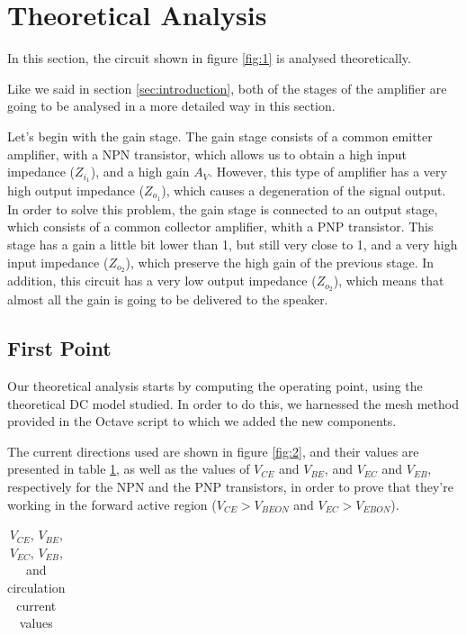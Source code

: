 \section{Theoretical Analysis}
\label{sec:theoretical}

\par In this section, the circuit shown in figure \ref{fig:1} is analysed theoretically.
\par Like we said in section \ref{sec:introduction}, both of the stages of the amplifier are going to be analysed in a more detailed way in this section.
\par Let's begin with the gain stage. The gain stage consists of a common emitter amplifier, with a NPN transistor, which allows us to obtain a high input impedance ($Z_{i_1}$), and a high gain $A_V$. However, this type of amplifier has a very high output impedance ($Z_{o_1}$), which causes a degeneration of the signal output. In order to solve this problem, the gain stage is connected to an output stage, which consists of a common collector amplifier, whith a PNP transistor. This stage has a gain a little bit lower than 1, but still very close to 1, and a very high input impedance ($Z_{o_2}$), which preserve the high gain of the previous stage. In addition, this circuit has a very low output impedance ($Z_{o_2}$), which means that almost all the gain is going to be delivered to the speaker.

\subsection{First Point}

\par Our theoretical analysis starts by computing the operating point, using the theoretical DC model studied. In order to do this, we harnessed the mesh method provided in the Octave script to which we added the new components.
\par The current directions used are shown in figure \ref{fig:2}, and their values are presented in table \ref{tab:currents}, as well as the values of $V_{CE}$ and $V_{BE}$, and $V_{EC}$ and $V_{EB}$, respectively for the NPN and the PNP transistors, in order to prove that they're working in the forward active region ($V_{CE} > V_{BEON}$ and $V_{EC} > V_{EBON}$).


\vspace{5mm}
\begin{table}[H]
	\centering
	\begin{tabularx}{0.9\textwidth} {
 	    | >{\raggedright\arraybackslash}X
  	    | >{\raggedleft\arraybackslash}X | }
	\hline
	
	\end{tabularx}
	\caption{$V_{CE}$, $V_{BE}$, $V_{EC}$, $V_{EB}$, and circulation current values}
	\label{tab:currents}
\end{table}
\vspace{5mm}

